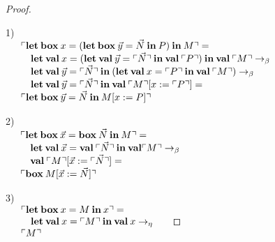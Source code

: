 \documentclass[a4paper]{article}
\begin{document}
\begin{proof}
$ $

1) \\
$\begin{array}{lll}
&\ulcorner {\bf let \: box \:} x = ({\bf let \: box \:} \vec{y} = \vec{N} {\: \bf in \:} P) {\: \bf in \:} M \urcorner = & \\
&\quad {\bf let \: val \:} x = ({\bf let \: val \:} \vec{y} = \ulcorner \vec{N} \urcorner {\: \bf in \:} {\bf val \:} \ulcorner P \urcorner) {\: \bf in \:} {\bf val \:} \ulcorner M \urcorner \rightarrow_{\beta} & \\
&\quad {\bf let \: val \:} \vec{y} = \ulcorner \vec{N} \urcorner {\: \bf in \:} ({\bf let \: val \:} x = \ulcorner P \urcorner {\: \bf in \:} {\bf val \:} \ulcorner M \urcorner) \rightarrow_{\beta} & \\
&\quad {\bf let \: val \:} \vec{y} = \ulcorner \vec{N} \urcorner {\: \bf in \:} {\bf val \:} \ulcorner M \urcorner [x := \ulcorner P \urcorner] = & \\
&\ulcorner {\bf let \: box \:} \vec{y} = \vec{N} {\: \bf in \:} M [x := P] \urcorner&
\end{array}$

\vspace{\baselineskip}

2) \\
$\begin{array}{lll}
&\ulcorner {\bf let \: box \:} \vec{x} = {\bf box \:} \vec{N} {\: \bf in \:} M \urcorner = & \\
&\quad {\bf let \: val \:} \vec{x} = {\bf val \:} \ulcorner \vec{N} \urcorner {\: \bf in \:} {\bf val} \ulcorner M \urcorner \rightarrow_{\beta} & \\
&\quad {\bf val \:} \ulcorner M \urcorner [\vec{x} := \ulcorner \vec{N} \urcorner] =& \\
&\ulcorner {\bf box \:} M [\vec{x} := \vec{N}] \urcorner&
\end{array}$

\vspace{\baselineskip}

3) \\
$\begin{array}{lll}
&\ulcorner {\bf let \: box \:} x = M {\: \bf in \:} x \urcorner = & \\
&\quad {\bf let \: val \:} x = \ulcorner M \urcorner {\: \bf in \:} {\bf val \:} x \rightarrow_{\eta}& \\
&\ulcorner M \urcorner&
\end{array}$

\end{proof}
\end{document}
